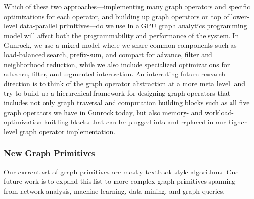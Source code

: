\documentclass[format=acmsmall,review=false,screen=true]{acmart}
\begin{document}
Which of these two approaches---implementing many graph operators and
specific optimizations for each operator, and building up graph
operators on top of lower-level data-parallel primitives---do we use
in a GPU graph analytics programming model will affect both the
programmability and performance of the system. In Gunrock, we use a
mixed model where we share common components such as load-balanced
search, prefix-sum, and compact for advance, filter and neighborhood
reduction, while we also include specialized optimizations for
advance, filter, and segmented intersection. An interesting future
research direction is to think of the graph operator abstraction at a
more meta level, and try to build up a hierarchical framework for
designing graph operators that includes not only graph traversal and
computation building blocks such as all five graph operators we have
in Gunrock today, but also memory- and workload-optimization building
blocks that can be plugged into and replaced in our higher-level graph
operator implementation.

\subsubsection{New Graph Primitives}
Our current set of graph primitives are mostly textbook-style
algorithms. One future work is to expand this list to more complex
graph primitives spanning from network analysis, machine learning,
data mining, and graph queries.
\end{document}
